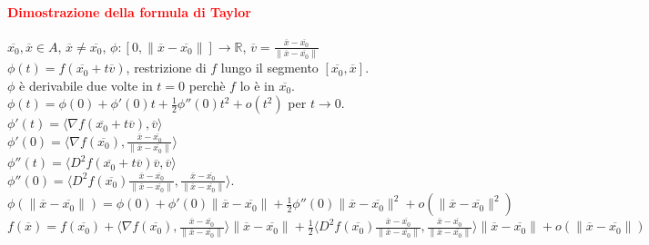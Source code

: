 \documentclass{article}
\newcommand{\R}{\mathbb{R}}
\begin{document}
\paragraph{\textcolor{red}{Dimostrazione della formula di Taylor}}
$\overline{x_0}, \overline{x}\in A$, $\overline{x}\neq \overline{x_0}$, $\phi:[0, \|\overline{x}-\overline{x_0}\|]\rightarrow \R$, $\overline{v}=\frac{\overline{x}-\overline{x_0}}{\|\overline{x}-\overline{x_0}\|}$\\
$\phi(t)=f(\overline{x_0}+t\overline{v})$, restrizione di $f$ lungo il segmento $[\overline{x_0},\overline{x}]$.\\
$\phi$ è derivabile due volte in $t=0$ perchè $f$ lo è in $\overline{x_0}$.\\
$\phi(t)=\phi(0)+\phi'(0)t+\frac{1}{2}\phi''(0)t^2+o(t^2)$ per $t \rightarrow 0$.\\
$\phi'(t)=\langle\nabla f(\overline{x_0}+t\overline{v}),\overline{v}\rangle$\\
$\phi'(0)=\langle \nabla f(\overline{x_0}), \frac{\overline{x}-\overline{x_0}}{\|\overline{x}-\overline{x_0}\|}\rangle$\\
$\phi''(t)=\langle D^2f(\overline{x_0}+t\overline{v})\overline{v},\overline{v} \rangle$\\
$\phi''(0)=\langle D^2 f(\overline{x_0})\frac{\overline{x}-\overline{x_0}}{\|\overline{x}-\overline{x_0}\|}, \frac{\overline{x}-\overline{x_0}}{\|\overline{x}-\overline{x_0}\|}\rangle$.\\
$\phi(\|\overline{x}-\overline{x_0}\|)=\phi(0)+\phi'(0) \|\overline{x}-\overline{x_0}\|+\frac{1}{2}\phi''(0)\| \overline{x}-\overline{x_0}\|^2+o(\|\overline{x}-\overline{x_0}\|^2)$\\
$f(\overline{x})=f(\overline{x_0})+\langle \nabla f(\overline{x_0}), \frac{\overline{x}-\overline{x_0}}{\|\overline{x}-\overline{x_0}\|} \rangle \|\overline{x} -\overline{x_0}\|+ \frac{1}{2}\langle D^2 f(\overline{x_0})\frac{\overline{x}-\overline{x_0}}{\|\overline{x}-\overline{x_0}\|},\frac{\overline{x}-\overline{x_0}}{\|\overline{x}-\overline{x_0}\|}  \rangle \|\overline{x}-\overline{x_0}\|+o(\|\overline{x}-\overline{x_0}\|)$
\begin{flushright}
    \Lightning
\end{flushright}
\end{document}
